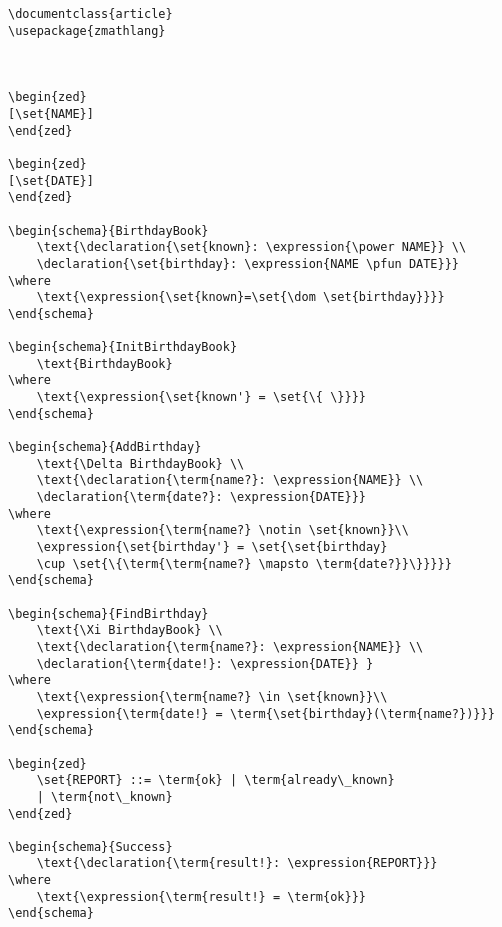 \begin{verbatim}
\documentclass{article}
\usepackage{zmathlang}



\begin{zed}
[\set{NAME}] 
\end{zed}

\begin{zed}
[\set{DATE}]
\end{zed}

\begin{schema}{BirthdayBook}
    \text{\declaration{\set{known}: \expression{\power NAME}} \\
    \declaration{\set{birthday}: \expression{NAME \pfun DATE}}}
\where
    \text{\expression{\set{known}=\set{\dom \set{birthday}}}}
\end{schema}

\begin{schema}{InitBirthdayBook}
    \text{BirthdayBook}
\where
    \text{\expression{\set{known'} = \set{\{ \}}}}
\end{schema}

\begin{schema}{AddBirthday}
    \text{\Delta BirthdayBook} \\
    \text{\declaration{\term{name?}: \expression{NAME}} \\
    \declaration{\term{date?}: \expression{DATE}}}
\where
    \text{\expression{\term{name?} \notin \set{known}}\\
    \expression{\set{birthday'} = \set{\set{birthday}
    \cup \set{\{\term{\term{name?} \mapsto \term{date?}}\}}}}}
\end{schema}

\begin{schema}{FindBirthday}
    \text{\Xi BirthdayBook} \\
    \text{\declaration{\term{name?}: \expression{NAME}} \\
    \declaration{\term{date!}: \expression{DATE}} }
\where
    \text{\expression{\term{name?} \in \set{known}}\\
    \expression{\term{date!} = \term{\set{birthday}(\term{name?})}}}
\end{schema}

\begin{zed} 
    \set{REPORT} ::= \term{ok} | \term{already\_known} 
    | \term{not\_known}
\end{zed}

\begin{schema}{Success}
    \text{\declaration{\term{result!}: \expression{REPORT}}}
\where
    \text{\expression{\term{result!} = \term{ok}}}
\end{schema}


\end{verbatim}
